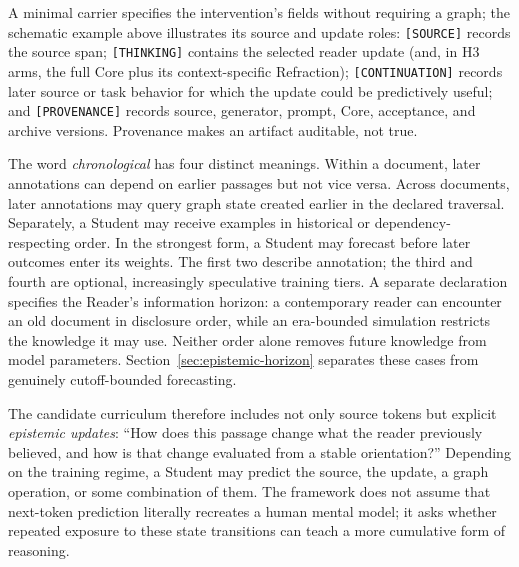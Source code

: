 \documentclass[11pt]{article}
\begin{document}
A minimal carrier specifies the intervention's fields without requiring a
graph; the schematic example above illustrates its source and update roles: \texttt{[SOURCE]} records the source span; \texttt{[THINKING]} contains
the selected reader update (and, in H3 arms, the full Core plus its
context-specific Refraction); \texttt{[CONTINUATION]} records later source or
task behavior for which the update could be predictively useful; and
\texttt{[PROVENANCE]} records source, generator, prompt, Core, acceptance, and
archive versions. Provenance makes an artifact auditable, not true.

The word \emph{chronological} has four distinct meanings. Within a document,
later annotations can depend on earlier passages but not vice versa. Across
documents, later annotations may query graph state created earlier in the
declared traversal. Separately, a Student may receive examples in historical or
dependency-respecting order. In the strongest form, a Student may forecast
before later outcomes enter its weights. The first two describe annotation; the
third and fourth are optional, increasingly speculative training tiers. A
separate declaration specifies the Reader's information horizon: a contemporary
reader can encounter an old document in disclosure order, while an era-bounded
simulation restricts the knowledge it may use. Neither order alone removes
future knowledge from model parameters. Section~\ref{sec:epistemic-horizon}
separates these cases from genuinely cutoff-bounded forecasting.

The candidate curriculum therefore includes not only source tokens but explicit \textit{epistemic updates}: ``How does this passage change what the reader previously believed, and how is that change evaluated from a stable orientation?'' Depending on the training regime, a Student may predict the source, the update, a graph operation, or some combination of them. The framework does not assume that next-token prediction literally recreates a human mental model; it asks whether repeated exposure to these state transitions can teach a more cumulative form of reasoning.
\end{document}
